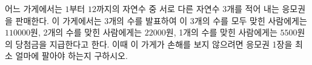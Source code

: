 어느 가게에서는 $1$부터 $12$까지의 자연수 중 서로 다른 자연수 3개를 적어 내는 응모권을 판매한다. 이 가게에서는 3개의 수를 발표하여 이 3개의 수를 모두 맞힌 사람에게는 $110000$원, 2개의 수를 맞힌 사람에게는 $22000$원, 1개의 수를 맞힌 사람에게는 $5500$원의 당첨금을 지급한다고 한다. 이때 이 가게가 손해를 보지 않으려면 응모권 1장을 최소 얼마에 팔아야 하는지 구하시오.
